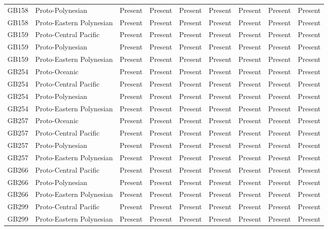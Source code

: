 \begin{longtable}{p{1.5cm}p{2.5cm}p{2.5cm}p{2.5cm}p{2.5cm}p{2.5cm}p{2.5cm}p{2.5cm}p{2.5cm}}
  GB158 & Proto-Polynesian & Present & Present & Present & Present & Present & Present & Present \\ 
  GB158 & Proto-Eastern Polynesian & Present & Present & Present & Present & Present & Present & Present \\ 
  GB159 & Proto-Central Pacific & Present & Present & Present & Present & Present & Present & Present \\ 
  GB159 & Proto-Polynesian & Present & Present & Present & Present & Present & Present & Present \\ 
  GB159 & Proto-Eastern Polynesian & Present & Present & Present & Present & Present & Present & Present \\ 
  GB254 & Proto-Oceanic & Present & Present & Present & Present & Present & Present & Present \\ 
  GB254 & Proto-Central Pacific & Present & Present & Present & Present & Present & Present & Present \\ 
  GB254 & Proto-Polynesian & Present & Present & Present & Present & Present & Present & Present \\ 
  GB254 & Proto-Eastern Polynesian & Present & Present & Present & Present & Present & Present & Present \\ 
  GB257 & Proto-Oceanic & Present & Present & Present & Present & Present & Present & Present \\ 
  GB257 & Proto-Central Pacific & Present & Present & Present & Present & Present & Present & Present \\ 
  GB257 & Proto-Polynesian & Present & Present & Present & Present & Present & Present & Present \\ 
  GB257 & Proto-Eastern Polynesian & Present & Present & Present & Present & Present & Present & Present \\ 
  GB266 & Proto-Central Pacific & Present & Present & Present & Present & Present & Present & Present \\ 
  GB266 & Proto-Polynesian & Present & Present & Present & Present & Present & Present & Present \\ 
  GB266 & Proto-Eastern Polynesian & Present & Present & Present & Present & Present & Present & Present \\ 
  GB299 & Proto-Central Pacific & Present & Present & Present & Present & Present & Present & Present \\ 
  GB299 & Proto-Eastern Polynesian & Present & Present & Present & Present & Present & Present & Present \\ 

\end{longtable}
